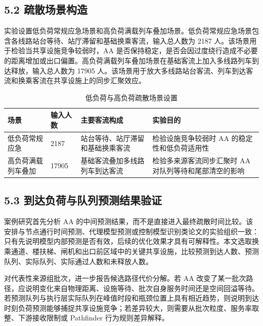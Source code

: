 \documentclass[UTF8,a4paper,12pt]{ctexart}
\begin{document}
\subsection{5.2 疏散场景构造}

实验设置低负荷常规应急场景和高负荷满载列车叠加场景。低负荷常规应急场景包含各线路站台等待、站厅滞留和基础换乘客流，输入总人数为 2187 人。该场景用于检验当共享设施竞争较弱时，AA 是否保持稳定，是否会因过度绕行造成不必要的距离增加或出口偏置。高负荷满载列车叠加场景在基础客流上加入多线路列车到达释放，输入总人数为 17905 人。该场景用于放大多线路站台客流、列车到达客流和换乘客流在共享设施上的同步汇聚效应。

\begin{table}[htbp]
\centering
\caption{低负荷与高负荷疏散场景设置}
\small
\begin{tabular}{p{}p{}p{}p{}}
\toprule
场景 & 输入人数 & 主要客流构成 & 实验目的 \\
\midrule
低负荷常规应急 & 2187 & 站台等待、站厅滞留和基础换乘客流 & 检验设施竞争较弱时 AA 的稳定性和低负荷适用性 \\
高负荷满载列车叠加 & 17905 & 基础客流叠加多线路列车到达客流 & 检验多来源客流同步汇聚时 AA 对队列等待和尾部清空的影响 \\
\bottomrule
\end{tabular}
\end{table}

\subsection{5.3 到达负荷与队列预测结果验证}

案例研究首先分析 AA 的中间预测结果，而不是直接进入最终疏散时间比较。该安排与节点通行时间预测、代理模型预测或控制模型识别类论文的实验组织一致：只有先说明模型内部预测是否有效，后续的优化效果才具有可解释性。本文选取换乘通道、楼扶梯、闸机和出口前区域中的关键共享设施，比较预测到达人数、预测队列、实际队列、实际通过人数和未释放人数。

对代表性来源组批次，进一步报告候选路径代价分解。若 AA 改变了某一批次路径，应说明变化来自物理距离、设施等待、批次自身服务时间还是空间回溢等待。若预测队列与执行层实际队列在峰值时段和瓶颈位置上具有相近趋势，则说明到达时刻负荷预测能够捕捉共享设施竞争；若差异较大，则需要从批次粒度、服务率取整、下游接收限制或 Pathfinder 行为规则差异解释。
\end{document}
